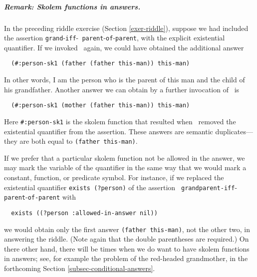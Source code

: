  \subparagraph{Remark: Skolem functions in answers.}  In the preceding
   riddle exercise (Section \ref{exer-riddle}), suppose we had
   included the assertion {\tt grand}-{\tt iff}-{\tt
   parent}-{\tt of}-{\tt parent}, with the explicit existential
   quantifier.  If we invoked \snark\  again, we could have obtained
   the additional answer
\begin{verbatim}
  (#:person-sk1 (father (father this-man)) this-man)
\end{verbatim}
In other words, I am the person who is the parent of this man and
the child of his grandfather.   Another answer we can obtain by a
further invocation of \snark\  is
\begin{verbatim}
  (#:person-sk1 (mother (father this-man)) this-man)
\end{verbatim}
Here \verb'#:person-sk1' is the skolem function that resulted when
\snark\  removed the existential quantifier from the assertion.
These answers are semantic duplicates---they are both equal to
\verb'(father this-man)'.

If we prefer that a particular skolem function not be
allowed in the answer, we may mark the variable of the
quantifier in the same way that we would mark a constant,
function, or predicate symbol.  For instance, if we replaced the
existential quantifier \verb|exists (?person)| of the assertion {\tt
grandparent-iff}-{\tt parent}-{\tt of-parent} with
\begin{verbatim}
  exists ((?person :allowed-in-answer nil))
\end{verbatim}
we would obtain only the first answer \verb|(father this-man)|, not
the other two, in answering the riddle. (Note again that the double
parentheses are required.)  On there other hand, there will be times
when we do want to have skolem functions in answers; see, for example
the problem of the red-headed grandmother, in the forthcoming Section
\ref{subsec-conditional-answers}.

